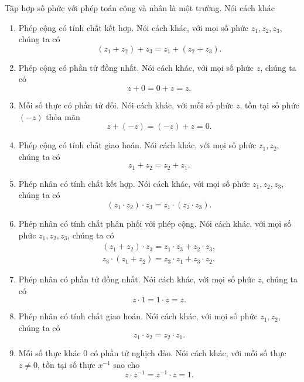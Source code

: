 \begin{theorem}\label{theorem:field-of-complex-numbers}
	Tập hợp số phức với phép toán cộng và nhân là một trường. Nói cách khác
	\begin{enumerate}[label={(F\arabic*)}]
		\item Phép cộng có tính chất kết hợp. Nói cách khác, với mọi số phức $z_{1}, z_{2}, z_{3}$, chúng ta có
		      \[
			      (z_{1} + z_{2}) + z_{3} = z_{1} + (z_{2} + z_{3}).
		      \]
		\item Phép cộng có phần tử đồng nhất. Nói cách khác, với mọi số phức $z$, chúng ta có
		      \[
			      z + 0 = 0 + z = z.
		      \]
		\item Mỗi số thực có phần tử đối. Nói cách khác, với mỗi số phức $z$, tồn tại số phức $(-z)$ thỏa mãn
		      \[
			      z + (-z) = (-z) + z = 0.
		      \]
		\item Phép cộng có tính chất giao hoán. Nói cách khác, với mọi số phức $z_{1}, z_{2}$, chúng ta có
		      \[
			      z_{1} + z_{2} = z_{2} + z_{1}.
		      \]
		\item Phép nhân có tính chất kết hợp. Nói cách khác, với mọi số phức $z_{1}, z_{2}, z_{3}$, chúng ta có
		      \[
			      (z_{1} \cdot z_{2}) \cdot z_{3} = z_{1} \cdot (z_{2} \cdot z_{3}).
		      \]
		\item Phép nhân có tính chất phân phối với phép cộng. Nói cách khác, với mọi số phức $z_{1}, z_{2}, z_{3}$, chúng ta có
		      \[
			      \begin{split}
				      (z_{1} + z_{2})\cdot z_{3} = z_{1}\cdot z_{3} + z_{2}\cdot z_{3}, \\
				      z_{3}\cdot (z_{1} + z_{2}) = z_{3}\cdot z_{1} + z_{3}\cdot z_{2}.
			      \end{split}
		      \]

		\item Phép nhân có phần tử đồng nhất. Nói cách khác, với mọi số phức $z$, chúng ta có
		      \[
			      z \cdot 1 = 1 \cdot z = z.
		      \]
		\item Phép nhân có tính chất giao hoán. Nói cách khác, với mọi số phức $z_{1}, z_{2}$, chúng ta có
		      \[
			      z_{1}\cdot z_{2} = z_{2}\cdot z_{1}.
		      \]
		\item Mỗi số thực khác $0$ có phần tử nghịch đảo. Nói cách khác, với mỗi số thực $z\ne 0$, tồn tại số thực $x^{-1}$ sao cho
		      \[
			      z\cdot z^{-1} = z^{-1}\cdot z = 1.
		      \]
	\end{enumerate}
\end{theorem}

